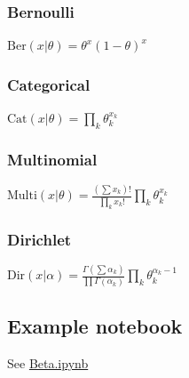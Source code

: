 \documentclass{article}
\begin{document}
\subsubsection*{Bernoulli}
$\textrm{Ber}(x|\theta) = \theta^{x}(1-\theta)^x$
\subsubsection*{Categorical}
$\textrm{Cat}(x|\theta) = \prod_k\theta_k^{x_k}$
\subsubsection*{Multinomial}
$\textrm{Multi}(x|\theta) = \frac{(\sum x_k) !}{\prod_k x_k!}\prod_k\theta_k^{x_k}$
\subsubsection*{Dirichlet}
$\textrm{Dir}(x|\alpha) = \frac{\Gamma(\sum \alpha_k)}{\prod \Gamma(\alpha_k)}\prod_k\theta_k^{\alpha_k-1}$

\subsection{Example notebook}
See \href{https://github.com/harvard-ml-courses/cs281-demos/blob/master/Beta.ipynb}{Beta.ipynb}
\end{document}
